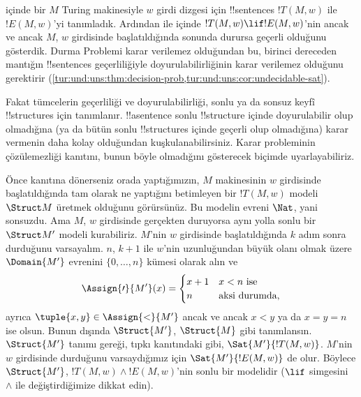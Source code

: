 


\begin{explain}
   içinde bir $M$ Turing makinesiyle $w$ girdi dizgesi için
  !!{sentence}s $!T(M,w)$ ile $!E(M,w)$'yi tanımladık. Ardından
   ile  içinde
  $!T(M,w)\lif !E(M,w)$'nin ancak ve ancak $M$, $w$ girdisinde
  başlatıldığında sonunda durursa geçerli olduğunu gösterdik. Durma Problemi
  karar verilemez olduğundan bu, birinci dereceden mantığın !!{sentence}s
  geçerliliğiyle doyurulabilirliğinin karar verilemez olduğunu gerektirir
  (\cref{tur:und:uns:thm:decision-prob,tur:und:uns:cor:undecidable-sat}).

  Fakat tümcelerin geçerliliği ve doyurulabilirliği, sonlu ya da sonsuz keyfî
  !!{structure}s için tanımlanır. !!a{sentence} sonlu !!{structure} içinde
  doyurulabilir olup olmadığına (ya da bütün sonlu !!{structure}s içinde
  geçerli olup olmadığına) karar vermenin daha kolay olduğundan
  kuşkulanabilirsiniz. Karar probleminin çözülemezliği kanıtını, bunun böyle
  olmadığını gösterecek biçimde uyarlayabiliriz.

  Önce  kanıtına dönerseniz orada yaptığımızın,
  $M$ makinesinin $w$ girdisinde başlatıldığında tam olarak ne yaptığını
  betimleyen bir $!T(M,w)$ modeli~$\Struct M$ üretmek olduğunu görürsünüz. Bu
  modelin evreni $\Nat$, yani sonsuzdu. Ama $M$, $w$ girdisinde gerçekten
  duruyorsa aynı yolla sonlu bir $\Struct M'$ modeli kurabiliriz. $M$'nin
  $w$ girdisinde başlatıldığında $k$ adım sonra durduğunu varsayalım.
  $n$, $k+1$ ile $w$'nin uzunluğundan büyük olanı olmak üzere
  $\Domain{M'}$ evrenini $\{0,\dots,n\}$ kümesi olarak alın ve
  \[
    \Assign{\prime}{M'}(x) = 
    \begin{cases}
      x + 1 &\text{$x < n$ ise}\\
      n &\text{aksi durumda,}
    \end{cases}
  \]
  ayrıca $\tuple{x,y}\in\Assign{<}{M'}$ ancak ve ancak $x<y$ ya da
  $x=y=n$ ise olsun. Bunun dışında $\Struct{M'}$, $\Struct{M}$ gibi
  tanımlansın. $\Struct{M'}$ tanımı gereği, tıpkı
   kanıtındaki gibi,
  $\Sat{M'}{!T(M,w)}$. $M$'nin $w$ girdisinde durduğunu varsaydığımız için
  $\Sat{M'}{!E(M,w)}$ de olur. Böylece $\Struct{M'}$,
  $!T(M,w)\land !E(M,w)$'nin sonlu bir modelidir ($\lif$ simgesini $\land$
  ile değiştirdiğimize dikkat edin).
  

\end{explain}
